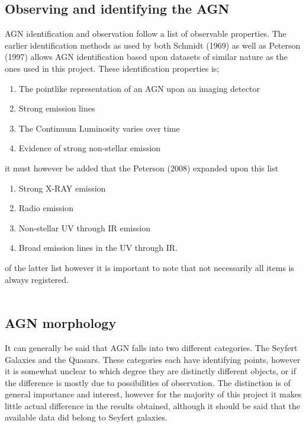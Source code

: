 \documentclass[11pt]{article}
\begin{document}
\subsection{Observing and identifying the AGN}
AGN identification and observation follow a list of observable properties. The earlier identification methods as used by both Schmidt (1969) as well as Peterson (1997) allows AGN identification based upon datasets of similar nature as the ones used in this project. These identification properties is; 
\begin{enumerate}
\item The pointlike representation of an AGN upon an imaging detector
\item Strong emission lines
\item The Continuum Luminosity varies over time
\item Evidence of strong non-stellar emission
\end{enumerate}
it must however be added that the Peterson (2008) expanded upon this list
\begin{enumerate}
\item Strong X-RAY emission
\item Radio emission
\item Non-stellar UV through IR emission
\item Broad emission lines in the UV through IR.
\end{enumerate}
of the latter list however it is important to note that not necessarily all items is always registered. \\
\\
\subsection{AGN morphology}
It can generally be said that AGN falls into two different categories. The Seyfert Galaxies and the Quasars. These categories each have identifying points, however it is somewhat unclear to which degree they are distinctly different objects, or if the difference is mostly due to possibilities of observation. The distinction is of general importance and interest, however for the majority of this project it makes little actual difference in the results obtained, although it should be said that the available data did belong to Seyfert galaxies. 
\end{document}
